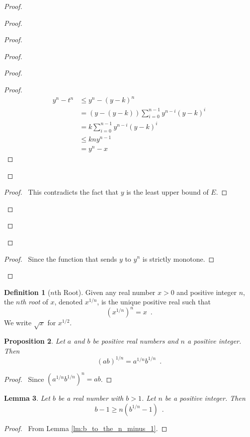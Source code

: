 \documentclass{book}
\let\qed\relax
\newtheorem{prop}{Proposition}[chapter]
\newtheorem{lm}[prop]{Lemma}
\theoremstyle{definition}
\newtheorem{df}[prop]{Definition}
\begin{document}
\begin{proof}
\begin{proof}
\begin{proof}
\begin{proof}
\begin{proof}
\begin{proof}
					\pf
					\begin{align*}
						y^n - t^n & \leq y^n - (y-k)^n \\
						& = (y-(y-k)) \sum_{i=0}^{n-1} y^{n-i} (y-k)^i \\
						& = k \sum_{i=0}^{n-1} y^{n-i} (y-k)^i \\
						& \leq kn y^{n-1} \\
						& = y^n - x
					\end{align*}
				\end{proof}
			\end{proof}
			\qedstep
			\begin{proof}
				\pf\ This contradicts the fact that $y$ is the least upper bound of $E$.
			\end{proof}
		\end{proof}
	\end{proof}
\end{proof}
\begin{proof}
	\pf\ Since the function that sends $y$ to $y^n$ is strictly monotone.
\end{proof}
\qed
\end{proof}

\begin{df}[$n$th Root]
Given any real number $x > 0$ and positive integer $n$, the \emph{$n$th root} of $x$, denoted $x^{1/n}$, is the unique positive real such that
\[ (x^{1/n})^n = x \enspace . \]
We write $\sqrt{x}$ for $x^{1/2}$.
\end{df}

\begin{prop}
\label{prop:root_mult}
Let $a$ and $b$ be positive real numbers and $n$ a positive integer. Then
\[ (ab)^{1/n} = a^{1/n} b^{1/n} \enspace . \]
\end{prop}

\begin{proof}
\pf\ Since $(a^{1/n} b^{1/n})^n = ab$. \qed
\end{proof}

\begin{lm}
Let $b$ be a real number with $b > 1$. Let $n$ be a positive integer. Then
\[ b - 1 \geq n(b^{1/n} - 1) \enspace . \]
\end{lm}

\begin{proof}
\pf\ From Lemma \ref{lm:b_to_the_n_minus_1}. \qed
\end{proof}
\end{document}
